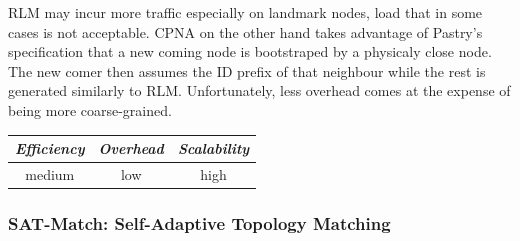 RLM may incur more traffic especially on landmark nodes, load that in some cases
is not acceptable. CPNA on the other hand takes advantage of Pastry's
specification that a new coming node is bootstraped by a physicaly close node.
The new comer then assumes the ID prefix of that neighbour while the rest is
generated similarly to RLM. Unfortunately, less overhead comes at the expense
of being more coarse-grained.

%
%
%

\begin{center}
\begin{tabular}{ccc}
\emph{Efficiency} & \emph{Overhead} & \emph{Scalability} \\
\hline
%
medium &
low &
high
\end{tabular}
\end{center}

\subsubsection{SAT-Match: Self-Adaptive Topology Matching}

